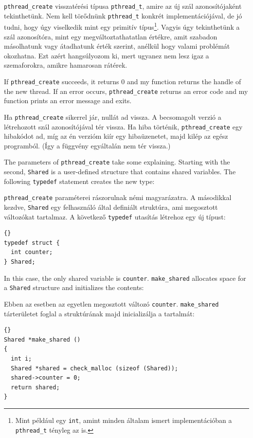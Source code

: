 \documentclass{book}
\begin{document}
{\tt pthread\_create} visszatérési típusa {\tt pthread\_t}, amire
az új szál azonosítójaként tekinthetünk. Nem kell törődnünk {\tt pthread\_t}
konkrét implementációjával, de jó tudni, hogy úgy viselkedik
mint egy primitív típus\footnote{Mint például egy {\tt int}, amint minden
általam ismert implementációban a {\tt pthread\_t} tényleg az is.}.
Vagyis úgy tekinthetünk a szál azonosítóra, mint egy megváltoztathatatlan
értékre, amit szabadon másolhatunk vagy átadhatunk érték szerint, 
anélkül hogy valami problémát okozhatna.
Ezt azért hangsúlyozom ki, mert ugyanez nem lesz igaz a szemaforokra,
amikre hamarosan rátérek.

If {\tt pthread\_create} succeeds, it returns 0 and my function
returns the handle of the new thread.
If an error occurs, {\tt pthread\_create} 
returns an error code and my function prints an error message
and exits.

Ha {\tt pthread\_create} sikerrel jár, nullát ad vissza. A
becsomagolt verzió a létrehozott szál azonosítójával tér vissza.
Ha hiba történik, {\tt pthread\_create} egy hibakódot ad,
míg az én verzióm kiír egy hibaüzenetet, majd kilép az
egész programból. (Így a függvény egyáltalán nem tér vissza.)

The parameters of {\tt pthread\_create} take some
explaining.  Starting with the second,
{\tt Shared}
is a user-defined structure that contains shared variables.
The following {\tt typedef} statement creates the new type:

{\tt pthread\_create} paraméterei rászorulnak némi magyarázatra.
A másodikkal kezdve, {\tt Shared} egy felhasználó által definiált
struktúra, ami megosztott változókat tartalmaz.
A következő {\tt typedef} utasítás létrehoz egy új típust:

\begin{lstlisting}[title={}]{}
typedef struct {
  int counter;
} Shared;
\end{lstlisting}

In this case, the only shared variable is {\tt counter}.
{\tt make\_shared} allocates
space for a {\tt Shared} structure and initializes the contents:

Ebben az esetben az egyetlen megosztott változó {\tt counter}.
{\tt make\_shared} tárterületet foglal a struktúrának majd
inicializálja a tartalmát:

\begin{lstlisting}[title={}]{}
Shared *make_shared ()
{
  int i;
  Shared *shared = check_malloc (sizeof (Shared));
  shared->counter = 0;
  return shared;
}
\end{lstlisting}
\end{document}
